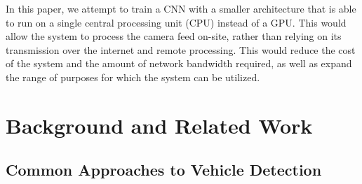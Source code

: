 





In this paper, we attempt to train a CNN with a smaller architecture that is
able to run on a single central processing unit (CPU) instead of a GPU. This
would allow the system to process the camera feed on-site, rather than relying
on its transmission over the internet and remote processing. This would reduce
the cost of the system and the amount of network bandwidth required, as well as
expand the range of purposes for which the system can be utilized.




\chapter{Background and Related Work}



\section{Common Approaches to Vehicle Detection}

